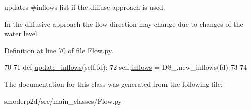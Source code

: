 updates \#inflows list if the diffuse approach is used. 

In the diffusive approach the flow direction may change due to changes of the water level. 

Definition at line 70 of file Flow.\-py.


\begin{DoxyCode}
70 
71   \textcolor{keyword}{def }\hyperlink{classsmoderp2d_1_1src_1_1main__classes_1_1Flow_1_1D8_a2c6113c6519048d1cd03869a270fad2e}{update\_inflows}(self,fd):
72     self.\hyperlink{classsmoderp2d_1_1src_1_1main__classes_1_1Flow_1_1D8_ae1e1934cd4984fc86d164b60c54788c4}{inflows} = D8\_.new\_inflows(fd)
73 
74 

\end{DoxyCode}


The documentation for this class was generated from the following file\-:\begin{DoxyCompactItemize}
\item 
smoderp2d/src/main\-\_\-classes/Flow.\-py\end{DoxyCompactItemize}
